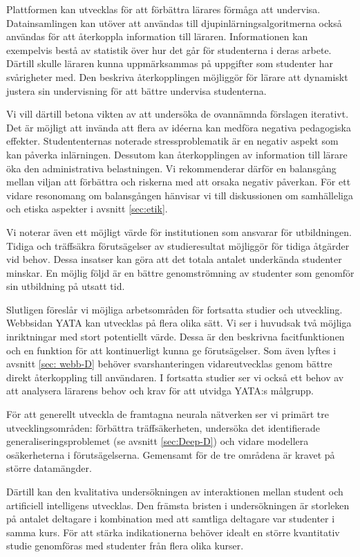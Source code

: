 Plattformen kan utvecklas för att förbättra lärares förmåga att undervisa. Datainsamlingen kan utöver att användas till djupinlärningsalgoritmerna också användas för att återkoppla information till läraren. Informationen kan exempelvis bestå av statistik över hur det går för studenterna i deras arbete. Därtill skulle läraren kunna uppmärksammas på uppgifter som studenter har svårigheter med. Den beskriva återkopplingen möjliggör för lärare att dynamiskt justera sin undervisning för att bättre undervisa studenterna.

Vi vill därtill betona vikten av att undersöka de ovannämnda förslagen iterativt. Det är möjligt att invända att flera av idéerna kan medföra negativa pedagogiska effekter. Studententernas noterade stressproblematik är en negativ aspekt som kan påverka inlärningen. Dessutom kan återkopplingen av information till lärare öka den administrativa belastningen. Vi rekommenderar därför en balansgång mellan viljan att förbättra och riskerna med att orsaka negativ påverkan. För ett vidare resonomang om balansgången hänvisar vi till diskussionen om samhälleliga och etiska aspekter i avsnitt \ref{sec:etik}.

Vi noterar även ett möjligt värde för institutionen som ansvarar för utbildningen. Tidiga och träffsäkra förutsägelser av studieresultat möjliggör för tidiga åtgärder vid behov. Dessa insatser kan göra att det totala antalet underkända studenter minskar. En möjlig följd är en bättre genomströmning av studenter som genomför sin utbildning på utsatt tid.

Slutligen föreslår vi möjliga arbetsområden för fortsatta studier och utveckling. Webbsidan YATA kan utvecklas på flera olika sätt. Vi ser i huvudsak två möjliga inriktningar med stort potentiellt värde. Dessa är den beskrivna facitfunktionen och en funktion för att kontinuerligt kunna ge förutsägelser. Som även lyftes i avsnitt \ref{sec: webb-D} behöver svarshanteringen vidareutvecklas genom bättre direkt återkoppling till användaren. I fortsatta studier ser vi också ett behov av att analysera lärarens behov och krav för att utvidga YATA:s målgrupp.

För att generellt utveckla de framtagna neurala nätverken ser vi primärt tre utvecklingsområden: förbättra träffsäkerheten, undersöka det identifierade generaliseringsproblemet (se avsnitt \ref{sec:Deep-D}) och vidare modellera osäkerheterna i förutsägelserna. Gemensamt för de tre områdena är kravet på större datamängder.

Därtill kan den kvalitativa undersökningen av interaktionen mellan student och artificiell intelligens utvecklas. Den främsta bristen i undersökningen är storleken på antalet deltagare i kombination med att samtliga deltagare var studenter i samma kurs. För att stärka indikationerna behöver idealt en större kvantitativ studie genomföras med studenter från flera olika kurser.



